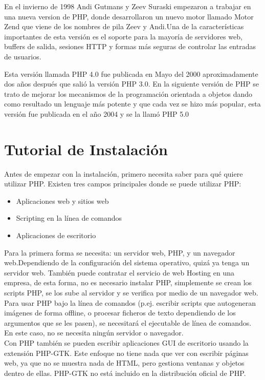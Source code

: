 \documentclass[11pt]{article} %
\begin{document}
En el invierno de 1998 Andi Gutmans y Zeev Suraski empezaron a trabajar en una nueva version de PHP, donde desarrollaron un nuevo motor llamado Motor Zend que viene de los nombres de pila Zeev y Andi.Una de la características importantes de esta versión es el soporte para la mayoría de servidores web, buffers de salida, sesiones HTTP y formas más seguras de controlar las entradas de usuarios.

Esta versión llamada PHP 4.0 fue publicada en Mayo del 2000 aproximadamente  dos años después que salió la versión PHP 3.0.
En la siguiente versión de PHP se trato de mejorar los mecanismos de la programación orientada a objetos dando como resultado un lenguaje más potente y que cada vez se hizo más popular, esta versión fue publicada en el año 2004 y se la llamó  PHP 5.0 
 

\section{Tutorial de Instalación}


Antes de empezar con la instalación, primero necesita saber para qué quiere utilizar PHP. Existen tres campos principales donde se puede utilizar PHP:

\begin {itemize}

\item Aplicaciones web y sitios web
\item Scripting en la línea de comandos
\item Aplicaciones de escritorio
\end {itemize}

Para la primera forma se necesita: un servidor web, PHP,  y un navegador web.Dependiendo de la configuración del sistema operativo, quizá ya tenga un servidor web. También puede contratar el servicio de web Hosting en una empresa, de esta forma, no es necesario instalar PHP, simplemente se crean los scripts PHP, se los sube al servidor y se verifica por medio de un navegador web.\\

Para usar PHP bajo la línea de comandos (p.ej. escribir scripts que autogeneran imágenes de forma offline, o procesar ficheros de texto dependiendo de los argumentos que se les pasen),  se necesitará el ejecutable de línea de comandos. En este caso, no se necesita ningún servidor o navegador.\\

Con PHP también se pueden escribir aplicaciones GUI de escritorio usando la extensión PHP-GTK. Este enfoque no tiene nada que ver con escribir páginas web, ya que no se muestra nada de HTML, pero gestiona ventanas y objetos dentro de ellas. PHP-GTK no está incluido en la distribución oficial de PHP.
\end{document}
